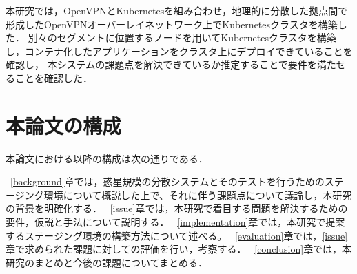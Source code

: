 本研究では，OpenVPNとKubernetesを組み合わせ，地理的に分散した拠点間で形成したOpenVPNオーバーレイネットワーク上でKubernetesクラスタを構築した．
別々のセグメントに位置するノードを用いてKubernetesクラスタを構築し，コンテナ化したアプリケーションをクラスタ上にデプロイできていることを確認し，
本システムの課題点を解決できているか推定することで要件を満たせることを確認した．

\section{本論文の構成}
\label{introduction:structure}

本論文における以降の構成は次の通りである．

~\ref{background}章では，惑星規模の分散システムとそのテストを行うためのステージング環境について概説した上で、それに伴う課題点について議論し，本研究の背景を明確化する．
~\ref{issue}章では，本研究で着目する問題を解決するための要件，仮説と手法について説明する．
~\ref{implementation}章では，本研究で提案するステージング環境の構築方法について述べる。
~\ref{evaluation}章では，\ref{issue}章で求められた課題に対しての評価を行い，考察する．
~\ref{conclusion}章では，本研究のまとめと今後の課題についてまとめる．

